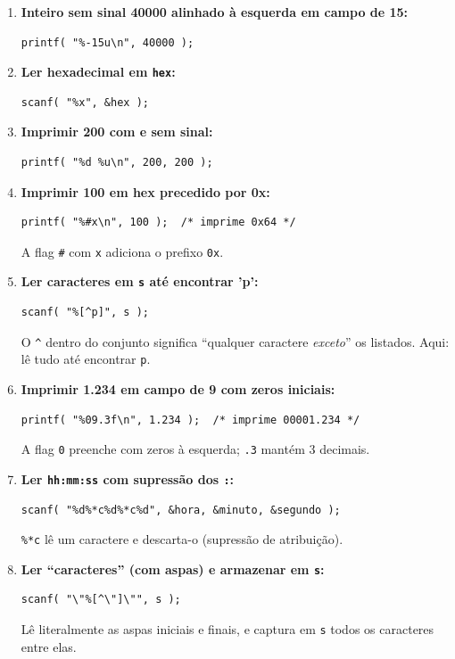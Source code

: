 \documentclass[12pt,a4paper]{article}
\begin{document}
\begin{respostabox}
\begin{enumerate}[label=\textbf{\alph*)}]

\item \textbf{Inteiro sem sinal 40000 alinhado à esquerda em campo de 15:}
\begin{lstlisting}
printf( "%-15u\n", 40000 );
\end{lstlisting}

\item \textbf{Ler hexadecimal em \texttt{hex}:}
\begin{lstlisting}
scanf( "%x", &hex );
\end{lstlisting}

\item \textbf{Imprimir 200 com e sem sinal:}
\begin{lstlisting}
printf( "%d %u\n", 200, 200 );
\end{lstlisting}

\item \textbf{Imprimir 100 em hex precedido por 0x:}
\begin{lstlisting}
printf( "%#x\n", 100 );  /* imprime 0x64 */
\end{lstlisting}
A flag \texttt{\#} com \texttt{x} adiciona o prefixo \texttt{0x}.

\item \textbf{Ler caracteres em \texttt{s} até encontrar 'p':}
\begin{lstlisting}
scanf( "%[^p]", s );
\end{lstlisting}
O \texttt{\^{}} dentro do conjunto significa ``qualquer caractere \textit{exceto}''
os listados. Aqui: lê tudo até encontrar \texttt{p}.

\item \textbf{Imprimir 1.234 em campo de 9 com zeros iniciais:}
\begin{lstlisting}
printf( "%09.3f\n", 1.234 );  /* imprime 00001.234 */
\end{lstlisting}
A flag \texttt{0} preenche com zeros à esquerda; \texttt{.3} mantém 3 decimais.

\item \textbf{Ler \texttt{hh:mm:ss} com supressão dos \texttt{:}:}
\begin{lstlisting}
scanf( "%d%*c%d%*c%d", &hora, &minuto, &segundo );
\end{lstlisting}
\texttt{\%*c} lê um caractere e descarta-o (supressão de atribuição).

\item \textbf{Ler ``caracteres'' (com aspas) e armazenar em \texttt{s}:}
\begin{lstlisting}
scanf( "\"%[^\"]\"", s );
\end{lstlisting}
Lê literalmente as aspas iniciais e finais, e captura em \texttt{s} todos os
caracteres entre elas.


\end{enumerate}
\end{respostabox}
\end{document}
